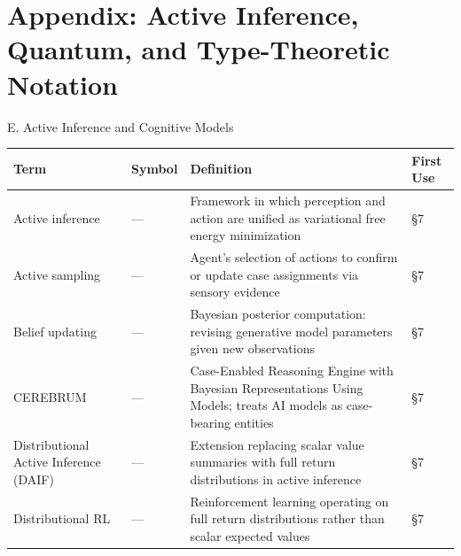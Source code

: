 \documentclass[
  ignorenonframetext,
]{beamer}
\author{\texorpdfstring{}{}}
\date{}
\newcounter{none} %
\begin{document}
\section{Appendix: Active Inference, Quantum, and Type-Theoretic
Notation}\label{appendix-active-inference-quantum-and-type-theoretic-notation}

\begin{frame}{E. Active Inference and Cognitive Models}
\protect{}\label{e.-active-inference-and-cognitive-models}
{\def\LTcaptype{none} %
\begin{longtable}[]{@{}
  >{\raggedright\arraybackslash}p{}
  >{\centering\arraybackslash}p{}
  >{\raggedright\arraybackslash}p{}
  >{\centering\arraybackslash}p{}@{}}
\toprule\noalign{}
\begin{minipage}[b]{\linewidth}\raggedright
Term
\end{minipage} & \begin{minipage}[b]{\linewidth}\centering
Symbol
\end{minipage} & \begin{minipage}[b]{\linewidth}\raggedright
Definition
\end{minipage} & \begin{minipage}[b]{\linewidth}\centering
First Use
\end{minipage} \\
\midrule\noalign{}
\endhead
Active inference & --- & Framework in which perception and action are
unified as variational free energy minimization & §7 \\
Active sampling & --- & Agent's selection of actions to confirm or
update case assignments via sensory evidence & §7 \\
Belief updating & --- & Bayesian posterior computation: revising
generative model parameters given new observations & §7 \\
CEREBRUM & --- & Case-Enabled Reasoning Engine with Bayesian
Representations Using Models; treats AI models as case-bearing entities
& §7 \\
Distributional Active Inference (DAIF) & --- & Extension replacing
scalar value summaries with full return distributions in active
inference & §7 \\
Distributional RL & --- & Reinforcement learning operating on full
return distributions rather than scalar expected values & §7 \\

\end{longtable}}
\end{frame}
\end{document}
